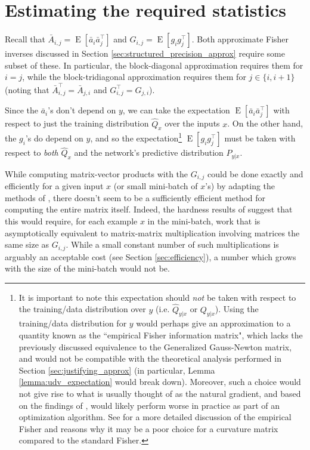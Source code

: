 \documentclass[12pt]{article}
\newcommand{\expected}{\operatorname{E}}
\begin{document}
\section{Estimating the required statistics}
\label{sec:estimating_A_and_G}

Recall that $\bar{A}_{i,j} = \expected \left[ \bar{a}_i \bar{a}_j^\top \right]$ and $G_{i,j} = \expected \left[ g_i g_j^\top \right]$. Both approximate Fisher inverses discussed in Section \ref{sec:structured_precision_approx} require some subset of these.  In particular, the block-diagonal approximation requires them for $i = j$, while the block-tridiagonal approximation requires them for $j \in \{i,i+1\}$ (noting that $\bar{A}_{i,j}^\top = \bar{A}_{j,i}$ and $G_{i,j}^\top = G_{j,i}$).

Since the $\bar{a}_i$'s don't depend on $y$, we can take the expectation $\expected \left[ \bar{a}_i \bar{a}_j^\top \right]$ with respect to just the training distribution $\hat{Q}_x$ over the inputs $x$.  On the other hand, the $g_i$'s do depend on $y$, and so the expectation\footnote{It is important to note this expectation should \emph{not} be taken with respect to the training/data distribution over $y$ (i.e. $\hat{Q}_{y|x}$ or $Q_{y|x}$).  Using the training/data distribution for $y$ would perhaps give an approximation to a quantity known as the ``empirical Fisher information matrix", which lacks the previously discussed equivalence to the Generalized Gauss-Newton matrix, and would not be compatible with the theoretical analysis performed in Section \ref{sec:justifying_approx} (in particular, Lemma \ref{lemma:udv_expectation} would break down).  Moreover, such a choice would not give rise to what is usually thought of as the natural gradient, and based on the findings of \citet{HF}, would likely perform worse in practice as part of an optimization algorithm.  See \citet{ng_martens} for a more detailed discussion of the empirical Fisher and reasons why it may be a poor choice for a curvature matrix compared to the standard Fisher.} $\expected \left[ g_i g_j^\top \right]$ must be taken with respect to \emph{both} $\hat{Q}_x$ and the network's predictive distribution $P_{y|x}$.

While computing matrix-vector products with the $G_{i,j}$ could be done exactly and efficiently for a given input $x$ (or small mini-batch of $x$'s) by adapting the methods of \citet{schraudolph}, there doesn't seem to be a sufficiently efficient method for computing the entire matrix itself.  Indeed, the hardness results of \citet{curvprop} suggest that this would require, for each example $x$ in the mini-batch, work that is asymptotically equivalent to matrix-matrix multiplication involving matrices the same size as $G_{i,j}$.  While a small constant number of such multiplications is arguably an acceptable cost (see Section \ref{sec:efficiency}), a number which grows with the size of the mini-batch would not be.
\end{document}
